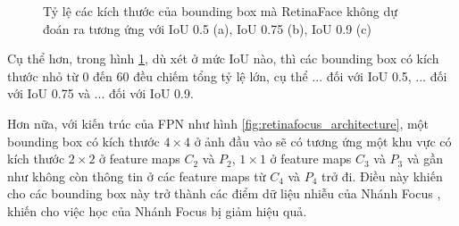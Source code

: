 {    \begin{figure}[H]
        \centering
        \caption{Tỷ lệ các kích thước của bounding box  mà RetinaFace không dự đoán ra tương ứng với IoU  0.5 (a), IoU  0.75 (b), IoU  0.9 (c)}
        \label{fig:retinafocus_iou_lower}
    \end{figure}

    \noindent
    Cụ thể hơn, trong hình \ref{fig:retinafocus_iou_lower}, dù xét ở mức IoU  nào, thì các bounding box  có kích thước nhỏ từ 0 đến 60 đều chiếm tổng tỷ lệ lớn, cụ thể ... đối với IoU  0.5, ... đối với IoU  0.75 và ... đối với IoU  0.9.

    \noindent
    Hơn nữa, với kiến trúc của FPN như hình \ref{fig:retinafocus_architecture}, một bounding box  có kích thước $4 \times 4$ ở ảnh đầu vào sẽ có tương ứng một khu vực có kích thước $2 \times 2$ ở feature maps  ${C}_{2}$ và ${P}_{2}$, $1 \times 1$ ở feature maps  ${C}_{3}$ và ${P}_{3}$ và gần như không còn thông tin ở các feature maps  từ ${C}_{4}$ và ${P}_{4}$ trở đi.
    Điều này khiến cho các bounding box  này trở thành các điểm dữ liệu nhiễu của Nhánh Focus , khiến cho việc học của Nhánh Focus  bị giảm hiệu quả.

}
